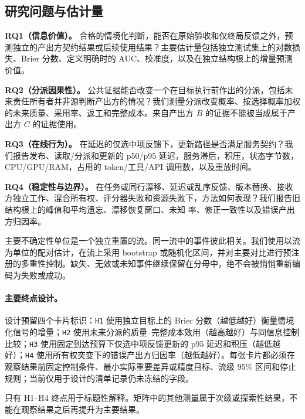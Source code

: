 \documentclass[UTF8,twocolumn]{ctexart}
\newcommand{\unknown}{\textsc{未知}}
\begin{document}
\subsection{研究问题与估计量}
\textbf{RQ1（信息价值）。} 合格的情境化判断，能否在原始验收和仅终局反馈之外，预测独立的产出方契约结果或后续使用结果？主要估计量包括独立测试集上的对数损失、Brier 分数、定义明确时的 AUC、校准度，以及在独立结构根上的增量预测价值。

\textbf{RQ2（分派因果性）。} 公共证据能否改变一个在目标执行前作出的分派，包括未来责任所有者并非源判断产出方的情况？我们测量分派改变概率、按选择概率加权的未来质量、采用率、返工和完整成本。来自产出方 $B$ 的证据不能被当成属于产出方 $C$ 的证据使用。

\textbf{RQ3（在线行为）。} 在延迟的仅选中项反馈下，更新路径是否满足服务契约？我们报告发布、读取/分派和更新的 p50/p95 延迟，服务滞后，积压，状态字节数，CPU/GPU/RAM，占用的 token/工具/API 调用数，以及重放时间。

\textbf{RQ4（稳定性与边界）。} 在任务或同行漂移、延迟或乱序反馈、版本替换、接收方独立工作、混合所有权、评分器失败和资源失败下，方法如何表现？我们报告旧结构根上的峰值和平均遗忘、漂移恢复窗口、\unknown{} 率、修正一致性以及错误产出方归因率。

主要不确定性单位是一个独立重置的流。同一流中的事件彼此相关。我们使用以流为单位的配对估计，在流上采用 bootstrap 或随机化区间，并对主要对比进行预注册的多重性控制。缺失、无效或未知事件继续保留在分母中，绝不会被悄悄重新编码为失败或成功。

\paragraph{主要终点设计。} 设计预留四个卡片标识：\texttt{H1} 使用独立目标上的 Brier 分数（越低越好）衡量情境化信号的增量；\texttt{H2} 使用未来分派的质量--完整成本效用（越高越好）与同信息控制比较；\texttt{H3} 使用固定到达预算下仅选中项反馈更新的 p95 延迟和积压（越低越好）；\texttt{H4} 使用所有权突变下的错误产出方归因率（越低越好）。每张卡片都必须在观察结果前固定控制条件、最小实际重要差异或精度目标、流级 95\% 区间和停止规则；当前仅用于设计的清单记录仍未冻结的字段。

只有 H1--H4 终点用于标题性解释。矩阵中的其他测量属于次级或探索性结果，不能在观察结果之后再提升为主要结果。
\end{document}
